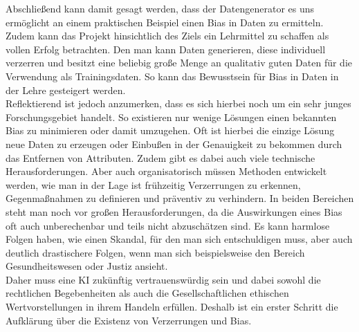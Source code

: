 \begin{onehalfspace}
Abschließend kann damit gesagt werden, dass der Datengenerator es uns ermöglicht an einem praktischen Beispiel einen Bias in Daten zu ermitteln. Zudem kann das Projekt hinsichtlich des Ziels ein Lehrmittel zu schaffen als vollen Erfolg betrachten. Den man kann Daten generieren, diese individuell verzerren und besitzt eine beliebig große Menge an qualitativ guten Daten für die Verwendung als Trainingsdaten. So kann das Bewusstsein für Bias in Daten in der Lehre gesteigert werden.\\
Reflektierend ist jedoch anzumerken, dass es sich hierbei noch um ein sehr junges Forschungsgebiet handelt. So existieren nur wenige Lösungen einen bekannten Bias zu minimieren oder damit umzugehen. Oft ist hierbei die einzige Lösung neue Daten zu erzeugen oder Einbußen in der Genauigkeit zu bekommen durch das Entfernen von Attributen. Zudem gibt es dabei auch viele technische Herausforderungen. Aber auch organisatorisch müssen Methoden entwickelt werden, wie man in der Lage ist frühzeitig Verzerrungen zu erkennen, Gegenmaßnahmen zu definieren und präventiv zu verhindern. In beiden Bereichen steht man noch vor großen Herausforderungen, da die Auswirkungen eines Bias oft auch unberechenbar und teils nicht abzuschätzen sind. Es kann harmlose Folgen haben, wie einen Skandal, für den man sich entschuldigen muss, aber auch deutlich drastischere Folgen, wenn man sich beispielsweise den Bereich Gesundheitswesen oder Justiz ansieht.\\
Daher muss eine KI zukünftig vertrauenswürdig sein und dabei sowohl die rechtlichen Begebenheiten als auch die Gesellschaftlichen ethischen Wertvorstellungen in ihrem Handeln erfüllen. Deshalb ist ein erster Schritt die Aufklärung über die Existenz von Verzerrungen und Bias.
\newpage

\end{onehalfspace}
